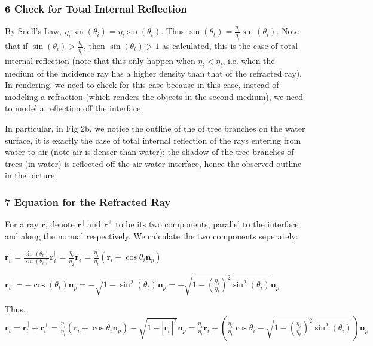 \documentclass[10pt,letter]{scrartcl}
\newcommand{\n}{\mathbf{n}} %
\newcommand{\ray}{\mathbf{r}} %
\theoremstyle{definition} %
\begin{document}
\subsubsection*{6 Check for Total Internal Reflection}%
By Snell\rq{}s Law, $\eta_i\sin({\theta_i}) = \eta_t\sin(\theta_t)$. Thus $\sin(\theta_t) = \frac{\eta_i}{\eta_t}\sin(\theta_i)$. Note that if $\sin(\theta_i) > \frac{\eta_t}{\eta_i}$, then $\sin(\theta_t) > 1$ as calculated, this is the case of total internal reflection (note that this only happen when $\eta_i < \eta_t$, i.e. when the medium of the incidence ray has a higher density than that of the refracted ray). In rendering, we need to check for this case because in this case, instead of modeling a refraction (which renders the objects in the second medium), we need to model a reflection off the interface. 

In particular, in Fig 2b, we notice the outline of the of tree branches on the water surface, it is exactly the case of total internal reflection of the rays entering from water to air (note air is denser than water); the shadow of the tree branches of trees (in water) is reflected off the air-water interface, hence the observed outline in the picture.


\subsubsection*{7 Equation for the Refracted Ray}%
For a ray $\ray$, denote $\ray^\parallel$ and $\ray^\perp$ to be its two components, parallel to the interface and along the normal respectively. We calculate the two components seperately: 
\begin{compactitem}
\item $\ray_t^\parallel = \frac{\sin(\theta_t)}{\sin(\theta_i)}\ray_i^\parallel = \frac{\eta_i}{\eta_2}\ray_i^\parallel = \frac{\eta_i}{\eta_t}(\ray_i + \cos\theta_i\n_p)$
\item $\ray_t^\perp = -\cos(\theta_t)\n_p = -\sqrt{1 - \sin^2(\theta_t)}\n_p = -\sqrt{1 - \left(\frac{\eta_i}{\eta_t}\right)^2\sin^2(\theta_i)}\n_p$
\end{compactitem}
Thus, $\ray_t = \ray_t^\parallel + \ray_t^\perp = \frac{\eta_i}{\eta_t}(\ray_i + \cos\theta_i\n_p) - \sqrt{1 - |\ray_t^\parallel|^2}\n_p = \frac{\eta_i}{\eta_t}\ray_i + \left(\frac{\eta_i}{\eta_t}\cos\theta_i - \sqrt{1 - \left(\frac{\eta_i}{\eta_t}\right)^2\sin^2(\theta_i)}\right)\n_p$
\end{document}
